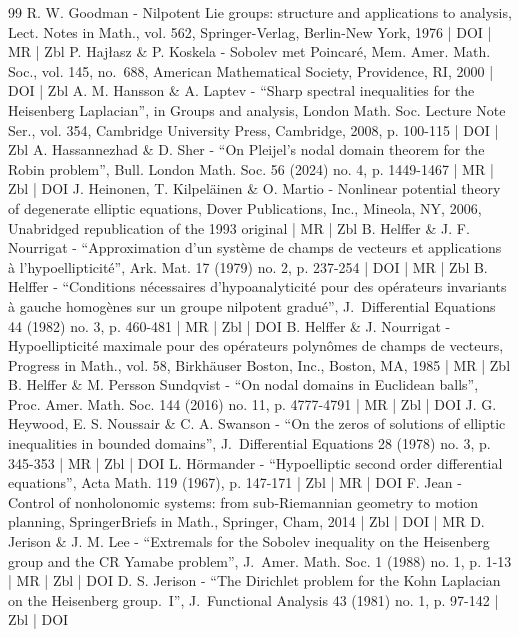 \begin{thebibliography}{99}
R. W. Goodman - Nilpotent Lie groups: structure and applications to analysis, Lect. Notes in Math., vol. 562, Springer-Verlag, Berlin-New York, 1976 | DOI | MR | Zbl
P. Hajłasz \& P. Koskela - Sobolev met Poincaré, Mem. Amer. Math. Soc., vol. 145, no. 688, American Mathematical Society, Providence, RI, 2000 | DOI | Zbl
A. M. Hansson \& A. Laptev - “Sharp spectral inequalities for the Heisenberg Laplacian”, in Groups and analysis, London Math. Soc. Lecture Note Ser., vol. 354, Cambridge University Press, Cambridge, 2008, p. 100-115 | DOI | Zbl
A. Hassannezhad \& D. Sher - “On Pleijel’s nodal domain theorem for the Robin problem”, Bull. London Math. Soc. 56 (2024) no. 4, p. 1449-1467 | MR | Zbl | DOI
J. Heinonen, T. Kilpeläinen \& O. Martio - Nonlinear potential theory of degenerate elliptic equations, Dover Publications, Inc., Mineola, NY, 2006, Unabridged republication of the 1993 original | MR | Zbl
B. Helffer \& J. F. Nourrigat - “Approximation d’un système de champs de vecteurs et applications à l’hypoellipticité”, Ark. Mat. 17 (1979) no. 2, p. 237-254 | DOI | MR | Zbl
B. Helffer - “Conditions nécessaires d’hypoanalyticité pour des opérateurs invariants à gauche homogènes sur un groupe nilpotent gradué”, J. Differential Equations 44 (1982) no. 3, p. 460-481 | MR | Zbl | DOI
B. Helffer \& J. Nourrigat - Hypoellipticité maximale pour des opérateurs polynômes de champs de vecteurs, Progress in Math., vol. 58, Birkhäuser Boston, Inc., Boston, MA, 1985 | MR | Zbl
B. Helffer \& M. Persson Sundqvist - “On nodal domains in Euclidean balls”, Proc. Amer. Math. Soc. 144 (2016) no. 11, p. 4777-4791 | MR | Zbl | DOI
J. G. Heywood, E. S. Noussair \& C. A. Swanson - “On the zeros of solutions of elliptic inequalities in bounded domains”, J. Differential Equations 28 (1978) no. 3, p. 345-353 | MR | Zbl | DOI
L. Hörmander - “Hypoelliptic second order differential equations”, Acta Math. 119 (1967), p. 147-171 | Zbl | MR | DOI
F. Jean - Control of nonholonomic systems: from sub-Riemannian geometry to motion planning, SpringerBriefs in Math., Springer, Cham, 2014 | Zbl | DOI | MR
D. Jerison \& J. M. Lee - “Extremals for the Sobolev inequality on the Heisenberg group and the CR Yamabe problem”, J. Amer. Math. Soc. 1 (1988) no. 1, p. 1-13 | MR | Zbl | DOI
D. S. Jerison - “The Dirichlet problem for the Kohn Laplacian on the Heisenberg group. I”, J. Functional Analysis 43 (1981) no. 1, p. 97-142 | Zbl | DOI

\end{thebibliography}
